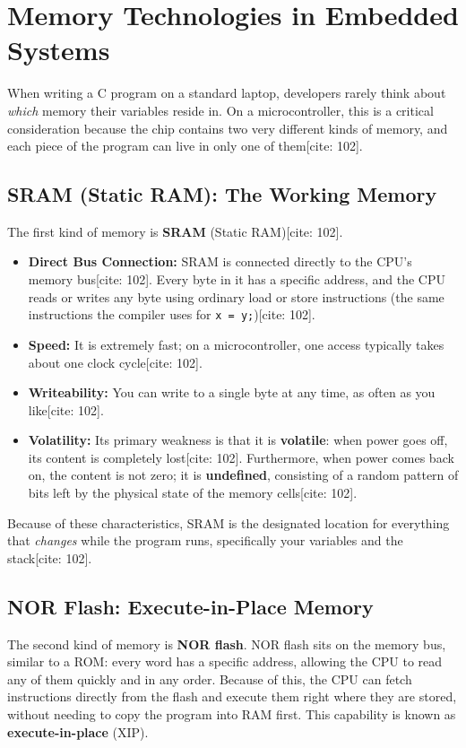 \section{Memory Technologies in Embedded Systems}
When writing a C program on a standard laptop, developers rarely think about \textit{which} memory their variables reside in. On a microcontroller, this is a critical consideration because the chip contains two very different kinds of memory, and each piece of the program can live in only one of them[cite: 102].

\subsection{SRAM (Static RAM): The Working Memory}
The first kind of memory is \textbf{SRAM} (Static RAM)[cite: 102]. 
\begin{itemize}
    \item \textbf{Direct Bus Connection:} SRAM is connected directly to the CPU's memory bus[cite: 102]. Every byte in it has a specific address, and the CPU reads or writes any byte using ordinary load or store instructions (the same instructions the compiler uses for \texttt{x = y;})[cite: 102].
    \item \textbf{Speed:} It is extremely fast; on a microcontroller, one access typically takes about one clock cycle[cite: 102].
    \item \textbf{Writeability:} You can write to a single byte at any time, as often as you like[cite: 102].
    \item \textbf{Volatility:} Its primary weakness is that it is \textbf{volatile}: when power goes off, its content is completely lost[cite: 102]. Furthermore, when power comes back on, the content is not zero; it is \textbf{undefined}, consisting of a random pattern of bits left by the physical state of the memory cells[cite: 102].
\end{itemize}
Because of these characteristics, SRAM is the designated location for everything that \textit{changes} while the program runs, specifically your variables and the stack[cite: 102].
\subsection{NOR Flash: Execute-in-Place Memory}
The second kind of memory is \textbf{NOR flash}. NOR flash sits on the memory bus, similar to a ROM: every word has a specific address, allowing the CPU to read any of them quickly and in any order. Because of this, the CPU can fetch instructions directly from the flash and execute them right where they are stored, without needing to copy the program into RAM first. This capability is known as \textbf{execute-in-place} (XIP). 


